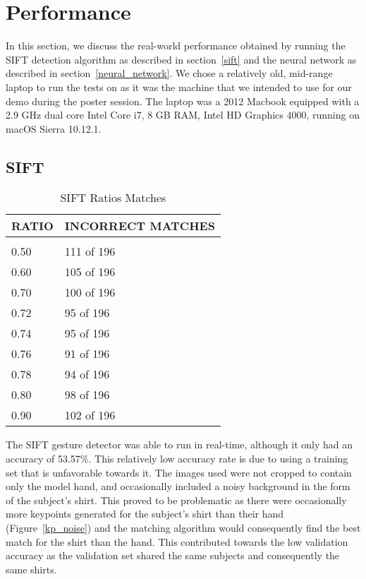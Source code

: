 \section{Performance}
\label{performance}

In this section, we discuss the real-world performance obtained by running the SIFT detection algorithm as described in section~\ref{sift} and the neural network as described in section~\ref{neural_network}. We chose a relatively old, mid-range laptop to run the tests on as it was the machine that we intended to use for our demo during the poster session. The laptop was a 2012 Macbook equipped with a 2.9 GHz dual core Intel Core i7, 8 GB RAM, Intel HD Graphics 4000, running on macOS Sierra 10.12.1.
\subsection{SIFT}
\label{perf_SIFT}

\begin{table}[t]
\caption{SIFT Ratios Matches}
\label{sift_ratios}
\begin{center}
\begin{tabular}{ll}
\multicolumn{1}{c}{\bf RATIO}  &\multicolumn{1}{c}{\bf INCORRECT MATCHES}
\\ \hline \\
0.50             &111 of 196 \\
0.60             &105 of 196 \\
0.70             &100 of 196 \\
0.72             &95 of 196 \\
0.74             &95 of 196 \\
0.76             &91 of 196 \\
0.78             &94 of 196 \\
0.80             &98 of 196 \\
0.90             &102 of 196 \\
\end{tabular}
\end{center}
\end{table}

The SIFT gesture detector was able to run in real-time, although it only had an accuracy of 53.57\%. This relatively low accuracy rate is due to using a training set that is unfavorable towards it. The images used were not cropped to contain only the model hand, and occasionally included a noisy background in the form of the subject's shirt. This proved to be problematic as there were occasionally more keypoints generated for the subject's shirt than their hand (Figure~\ref{kp_noise}) and the matching algorithm would consequently find the best match for the shirt than the hand. This contributed towards the low validation accuracy as the validation set shared the same subjects and consequently the same shirts.

